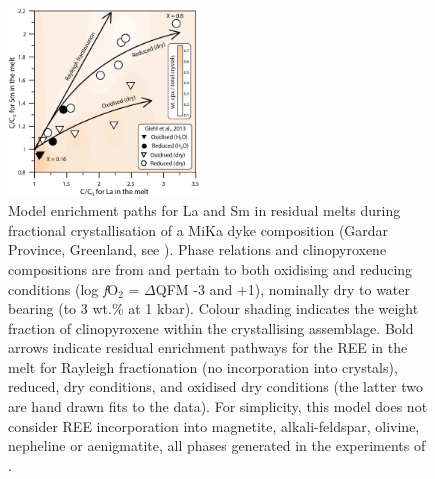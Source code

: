 \documentclass[review,authoryear,12pt]{elsarticle}
\newcommand{\fO}{\textit{f}O$_{2}$ }
\begin{document}
 \begin{figure}[bt]
        \begin{center}
        \includegraphics[width=0.45\textwidth]{15_FractCryst_Giehl_NoContours.eps}
        \caption[La vs. Sm diagram showing the geochemical evolution of the MiKa dyke, Gardar province, Greenland]    
        {Model enrichment paths for La and Sm in residual melts during fractional crystallisation of a MiKa dyke composition (Gardar Province, Greenland, see \citealt{Marks2003}). Phase relations and clinopyroxene compositions are from \citet{Giehl2013} and pertain to both oxidising and reducing conditions (log \fO = $\Delta$QFM -3 and +1), nominally dry to water bearing (to 3 wt.\%  at 1 kbar). Colour shading indicates the weight fraction of clinopyroxene within the crystallising assemblage. Bold arrows indicate residual enrichment pathways for the REE in the melt for Rayleigh fractionation (no incorporation into crystals), reduced, dry conditions, and oxidised dry conditions (the latter two are hand drawn fits to the data). For simplicity, this model does not consider REE incorporation into magnetite, alkali-feldspar, olivine, nepheline or aenigmatite, all phases generated in the experiments of \citet{Giehl2013} \citep[see][]{Larsen1979,Kovalenko1988,Mahood1990}.}
        \label{15_Fract_Cryst}
        \end{center}
        \end{figure}
\end{document}
